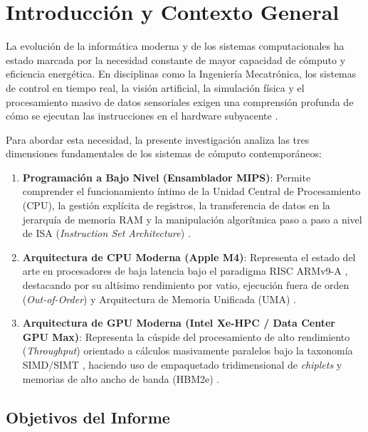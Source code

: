 \documentclass[12pt,a4paper]{article}
\begin{document}
\section{Introducción y Contexto General}

La evolución de la informática moderna y de los sistemas computacionales ha estado marcada por la necesidad constante de mayor capacidad de cómputo y eficiencia energética. En disciplinas como la Ingeniería Mecatrónica, los sistemas de control en tiempo real, la visión artificial, la simulación física y el procesamiento masivo de datos sensoriales exigen una comprensión profunda de cómo se ejecutan las instrucciones en el hardware subyacente \cite{patterson}.

Para abordar esta necesidad, la presente investigación analiza las tres dimensiones fundamentales de los sistemas de cómputo contemporáneos:
\begin{enumerate}[leftmargin=*]
    \item \textbf{Programación a Bajo Nivel (Ensamblador MIPS)}: Permite comprender el funcionamiento íntimo de la Unidad Central de Procesamiento (CPU), la gestión explícita de registros, la transferencia de datos en la jerarquía de memoria RAM y la manipulación algorítmica paso a paso a nivel de ISA (\textit{Instruction Set Architecture}) \cite{patterson, mars}.
    \item \textbf{Arquitectura de CPU Moderna (Apple M4)}: Representa el estado del arte en procesadores de baja latencia bajo el paradigma RISC ARMv9-A \cite{armv9}, destacando por su altísimo rendimiento por vatio, ejecución fuera de orden (\textit{Out-of-Order}) y Arquitectura de Memoria Unificada (UMA) \cite{apple_m4}.
    \item \textbf{Arquitectura de GPU Moderna (Intel Xe-HPC / Data Center GPU Max)}: Representa la cúspide del procesamiento de alto rendimiento (\textit{Throughput}) orientado a cálculos masivamente paralelos bajo la taxonomía SIMD/SIMT \cite{flynn}, haciendo uso de empaquetado tridimensional de \textit{chiplets} y memorias de alto ancho de banda (HBM2e) \cite{intel_pontevecchio}.
\end{enumerate}


\newpage
\subsection{Objetivos del Informe}
\end{document}
